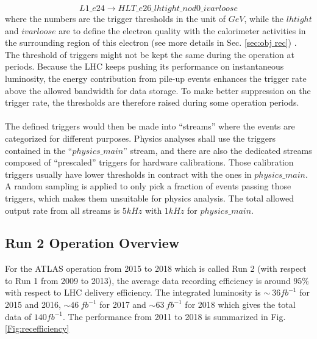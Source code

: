\begin{equation}
L1\_e24 \rightarrow HLT\_e26\_lhtight\_nod0\_ivarloose
\end{equation}
where the numbers are the trigger thresholds in the unit of $GeV$, while the $lhtight$ and $ivarloose$ are to define the electron quality with the calorimeter activities in the surrounding region of this electron (see more details in Sec. \ref{sec:obj rec}) . The threshold of triggers might not be kept the same during the operation at periods. Because the LHC keeps pushing its performance on instantaneous luminosity, the energy contribution from pile-up events enhances the trigger rate above the allowed bandwidth for data storage. To make better suppression on the trigger rate, the thresholds are therefore raised during some operation periods. 
\\
\\The defined triggers would then be made into ``streams'' where the events are categorized for different purposes. Physics analyses shall use the triggers contained in the ``$physics\_main$'' stream, and there are also the dedicated streams composed of ``prescaled'' triggers for hardware calibrations. Those calibration triggers usually have lower thresholds in contract with the ones in $physics\_main$. A random sampling is applied to only pick a fraction of events passing those triggers, which makes them unsuitable for physics analysis. The total allowed output rate from all streams is $5kHz$ with $1kHz$ for $physics\_main$. 

\subsection{Run 2 Operation Overview}
For the ATLAS operation from 2015 to 2018 which is called Run 2 (with respect to Run 1 from 2009 to 2013), the average data recording efficiency is around $95\%$ with respect to LHC delivery efficiency. The integrated luminosity is $\sim~36fb^{-1}$ for 2015 and 2016, $\sim46~fb^{-1}$ for 2017 and $\sim63~fb^{-1}$ for 2018 which gives the total data of $140 fb^{-1}$. The performance from 2011 to 2018 is summarized in Fig. \ref{Fig:recefficiency}


